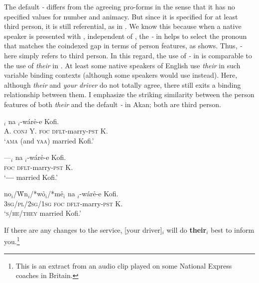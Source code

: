 \documentclass[output=paper]{LSP/langsci}
\begin{document}
 
The default \textit{\eer-} differs from the agreeing pro-forms in the sense that it has no specified values for number and animacy. But since it is specified for at least third person, it is still referential, as in . We know this because when a native speaker is presented with , independent of , the \textit{\eer-} in  helps to select the pronoun that matches the coindexed gap in terms of person features, as  shows. Thus, \textit{\eer-} here simply refers to third person.  In this regard, the use of \textit{\eer-} in  is comparable to the use of \textit{their} in . At least some native speakers of English use \textit{their} in such variable binding contexts (although some speakers would use  instead).  Here, although \textit{their} and \textit{your driver} do not totally agree, there still exits a binding relationship between them. I emphasize the striking similarity between the person features of both  \textit{their} and the default \textit{\eer-} in Akan; both are third person.


\ea\label{ex:korsah:24} 
\ea\label{ex:korsah:24a}
$_i$ na  \eer$_i$-w{\'{a}}r\h e-e Kofi.\\
 A. \textsc{conj} Y. \textsc{foc} \textsc{dflt}-marry-\textsc{pst} K.\\
\glt  `\textsc{ama} (and \textsc{yaa}) married Kofi.'

\ex\label{ex:korsah:24b}
\gll ---$_i$ na  \eer$_i$-w{\'{a}}r\h e-e Kofi.\\
{} \textsc{foc} \textsc{dflt}-marry-\textsc{pst} K. \\
\glt  `\textbf{---} married Kofi.'

\ex\label{ex:korsah:24c}
\gll \scalebox{1.5}{\oor}no$_i$/W\h\oor n$_i$/*w\h o$_i$/*m\h e$_i$ na  \eer$_i$-w{\'{a}}r\h e-e Kofi.\\
\textsc{3sg/pl/2sg/1sg} \textsc{foc} \textsc{dflt}-marry-\textsc{pst} K.\\
\glt  `\textsc{s/he/they} married Kofi.'

\z
\z



\ea\label{ex:korsah:25} 
\ea\label{ex:korsah:25a}  
If there are any changes to the service, [your driver]$_i$ will do \textbf{their}$_i$ best to inform you.\footnote{This is an extract from an audio clip played on some National Express coaches in Britain. }
\end{document}
